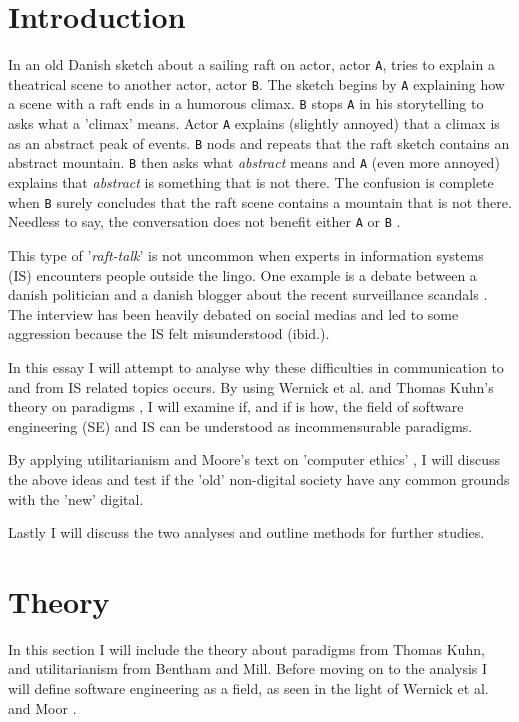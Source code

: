 \documentclass{article}
\begin{document}
\section{Introduction}
In an old Danish sketch about a sailing raft on actor, actor \texttt{A}, tries to explain a theatrical scene to another actor, actor \texttt{B}. The sketch begins by \texttt{A} explaining how a scene with a raft ends in a humorous climax. \texttt{B} stops \texttt{A} in his storytelling to asks what a 'climax' means. Actor \texttt{A} explains (slightly annoyed) that a climax is as an abstract peak of events. \texttt{B} nods and repeats that the raft sketch contains an abstract mountain. \texttt{B} then asks what \textit{abstract} means and \texttt{A} (even more annoyed) explains that \textit{abstract} is something that is not there. The confusion is complete when \texttt{B} surely concludes that the raft scene contains a mountain that is not there. Needless to say, the conversation does not benefit either \texttt{A} or \texttt{B} \citep{Raft:2014}.

This type of '\textit{raft-talk}' is not uncommon when experts in information systems (IS) encounters people outside the lingo. One example is a debate between a danish politician and a danish blogger about the recent surveillance scandals \citep{Bramsen:2014}. The interview has been heavily debated on social medias and led to some aggression because the IS felt misunderstood (ibid.).

In this essay I will attempt to analyse why these difficulties in communication to and from IS related topics occurs.
By using Wernick et al. and Thomas Kuhn's theory on paradigms \citep{Wernick:2004, Holm:2014}, I will examine if, and if is how, the field of software engineering (SE) and IS can be understood as incommensurable paradigms.

By applying utilitarianism and Moore's text on 'computer ethics' \citep{Moor:1985}, I will discuss the above ideas and test if the 'old' non-digital society have any common grounds with the 'new' digital.

Lastly I will discuss the two analyses and outline methods for further studies.

\section{Theory}
In this section I will include the theory about paradigms from Thomas Kuhn, and utilitarianism from Bentham and Mill. Before moving on to the analysis I will define software engineering as a field, as seen in the light of Wernick et al. and Moor \citep{Wernick:2004, Moor:1985}.
\end{document}

